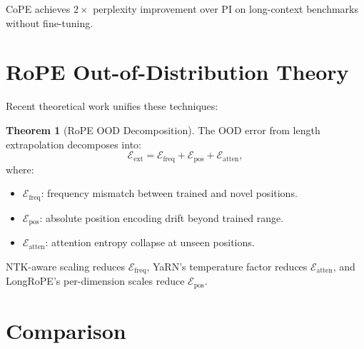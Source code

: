 \documentclass[11pt,a4paper]{book}
\theoremstyle{definition}
\newtheorem{theorem}{Theorem}[chapter]
\begin{document}
CoPE achieves $2\times$ perplexity improvement over PI on long-context benchmarks without fine-tuning.

\section{RoPE Out-of-Distribution Theory}

Recent theoretical work unifies these techniques:

\begin{theorem}[RoPE OOD Decomposition]
	The OOD error from length extrapolation decomposes into:
	\begin{equation}
		\mathcal{E}_{\text{ext}} = \mathcal{E}_{\text{freq}} + \mathcal{E}_{\text{pos}} + \mathcal{E}_{\text{atten}},
	\end{equation}
	where:
	\begin{itemize}
		\item $\mathcal{E}_{\text{freq}}$: frequency mismatch between trained and novel positions.
		\item $\mathcal{E}_{\text{pos}}$: absolute position encoding drift beyond trained range.
		\item $\mathcal{E}_{\text{atten}}$: attention entropy collapse at unseen positions.
	\end{itemize}
	NTK-aware scaling reduces $\mathcal{E}_{\text{freq}}$, YaRN's temperature factor reduces $\mathcal{E}_{\text{atten}}$, and LongRoPE's per-dimension scales reduce $\mathcal{E}_{\text{pos}}$.
\end{theorem}

\section{Comparison}
\end{document}
